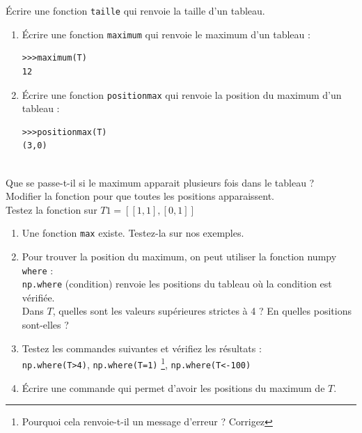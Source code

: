 \begin{exercice}
\' Ecrire une fonction \verb?taille? qui renvoie la taille d'un tableau.
\end{exercice}


\begin{exercice}
\begin{enumerate}
\item \' Ecrire une fonction \verb?maximum? qui renvoie le maximum d'un tableau :
\begin{verbatim}
>>>maximum(T)
12
\end{verbatim}
\item \' Ecrire une fonction \verb?positionmax? qui renvoie la position du maximum d'un tableau :
\begin{verbatim}
>>>positionmax(T)
(3,0)
\end{verbatim}
\end{enumerate}
\end{exercice}


\begin{exercice}~\\
Que se passe-t-il si le maximum apparait plusieurs fois dans le tableau ? \\
Modifier la fonction pour que toutes les positions apparaissent. \\
Testez la fonction sur $T1=[[1,1],[0,1]]$
\end{exercice}


\begin{exercice}
\begin{enumerate}
\item Une fonction \verb?max? existe. Testez-la sur nos exemples.
\item Pour trouver la position du maximum, on peut utiliser la fonction numpy \verb?where? :\\
\verb?np.where? (condition) renvoie les positions du tableau o\` u la condition est v\' erifi\' ee. \\
Dans $T$, quelles sont les valeurs sup\' erieures strictes \` a 4 ? En quelles positions sont-elles ?
\item Testez les commandes suivantes et v\' erifiez les r\' esultats :\\
\verb?np.where(T>4)?, \verb?np.where(T=1)? \footnote{Pourquoi cela renvoie-t-il un message d'erreur ? Corrigez}, \verb?np.where(T<-100)?
\item \' Ecrire une commande qui permet d'avoir les positions du maximum de $T$.
\end{enumerate}
\end{exercice}


